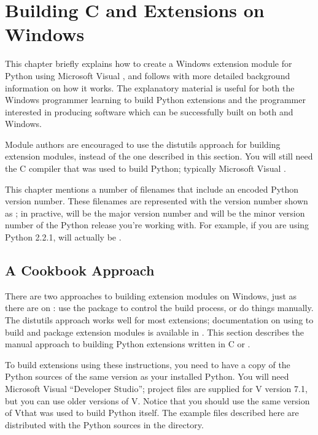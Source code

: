 \chapter{Building C and \Cpp{} Extensions on Windows%
     \label{building-on-windows}}


This chapter briefly explains how to create a Windows extension module
for Python using Microsoft Visual \Cpp, and follows with more
detailed background information on how it works.  The explanatory
material is useful for both the Windows programmer learning to build
Python extensions and the \UNIX{} programmer interested in producing
software which can be successfully built on both \UNIX{} and Windows.

Module authors are encouraged to use the distutils approach for
building extension modules, instead of the one described in this
section. You will still need the C compiler that was used to build
Python; typically Microsoft Visual \Cpp.

\begin{notice}
  This chapter mentions a number of filenames that include an encoded
  Python version number.  These filenames are represented with the
  version number shown as ; in practive,  will
  be the major version number and  will be the minor
  version number of the Python release you're working with.  For
  example, if you are using Python 2.2.1,  will actually be
  .
\end{notice}


\section{A Cookbook Approach \label{win-cookbook}}

There are two approaches to building extension modules on Windows,
just as there are on \UNIX: use the
 package to
control the build process, or do things manually.  The distutils
approach works well for most extensions; documentation on using
 to build and
package extension modules is available in
.  This
section describes the manual approach to building Python extensions
written in C or \Cpp.

To build extensions using these instructions, you need to have a copy
of the Python sources of the same version as your installed Python.
You will need Microsoft Visual \Cpp{} ``Developer Studio''; project
files are supplied for V\Cpp{} version 7.1, but you can use older
versions of V\Cpp.  Notice that you should use the same version of
V\Cpp that was used to build Python itself. The example files
described here are distributed with the Python sources in the
 directory.

